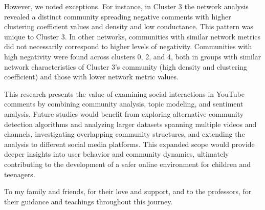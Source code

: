 \documentclass[sigconf]{acmart}
\begin{document}
However, we noted exceptions. For instance, in Cluster 3 the network analysis revealed a distinct 
community spreading negative comments with higher clustering coefficient values and density and low conductance.
This pattern was unique to Cluster 3. In other networks, communities with similar network metrics 
did not necessarily correspond to higher levels of negativity. 
Communities with high negativity were found across clusters 0, 2, and 4, both in groups with similar network 
characteristics of Cluster 3's community (high density and clustering coefficient) and those with 
lower network metric values. 
    
This research presents the value of examining social interactions in YouTube comments by combining community analysis, topic modeling, and sentiment analysis. Future studies would benefit 
from exploring alternative community detection algorithms and analyzing larger datasets spanning 
multiple videos and channels, investigating overlapping community structures, and extending the analysis to 
different social media platforms. This expanded scope would provide deeper insights into 
user behavior and community dynamics, ultimately contributing to the development of a safer online 
environment for children and teenagers.

\begin{acks}
To my family and friends, for their love and support, and to the professors, for their guidance 
and teachings throughout this journey.
\end{acks}



\balance




\end{document}

